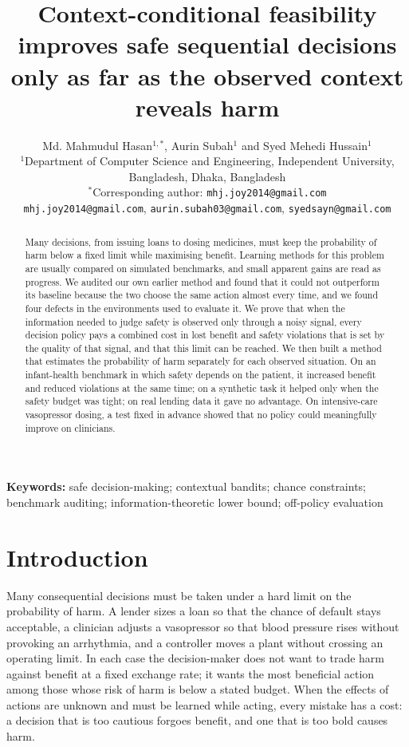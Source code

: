 \documentclass[10pt,a4paper]{article}
\title{\Large\bfseries Context-conditional feasibility improves safe sequential decisions\\ only as far as the observed context reveals harm}
\author{Md. Mahmudul Hasan$^{1,*}$, Aurin Subah$^{1}$ and Syed Mehedi Hussain$^{1}$\\[4pt]
\normalsize $^{1}$Department of Computer Science and Engineering, Independent University, Bangladesh, Dhaka, Bangladesh\\
\normalsize $^{*}$Corresponding author: \texttt{mhj.joy2014@gmail.com}\\
\normalsize \texttt{mhj.joy2014@gmail.com}, \texttt{aurin.subah03@gmail.com}, \texttt{syedsayn@gmail.com}}
\date{}
\begin{document}
\maketitle

\begin{abstract}
\noindent Many decisions, from issuing loans to dosing medicines, must keep the probability of harm
below a fixed limit while maximising benefit. Learning methods for this problem are
usually compared on simulated benchmarks, and small apparent gains are read as progress. We audited our own earlier method and found that it could not outperform its baseline because the two choose the same action almost every time, and we found four defects in the environments used to evaluate it. We prove that
when the information needed to judge safety is observed only through a noisy signal, every decision
policy pays a combined cost in lost benefit and safety violations that is set by the quality of that
signal, and that this limit can be reached. We then built a method that estimates the
probability of harm separately for each observed situation. On an infant-health benchmark in which
safety depends on the patient, it increased benefit and reduced violations at the same time; on a
synthetic task it helped only when the safety budget was tight; on real lending data it gave no
advantage. On intensive-care vasopressor dosing, a test fixed in advance showed that no policy could
meaningfully improve on clinicians.
\end{abstract}

\noindent\textbf{Keywords:} safe decision-making; contextual bandits; chance constraints; benchmark
auditing; information-theoretic lower bound; off-policy evaluation

\section*{Introduction}

Many consequential decisions must be taken under a hard limit on the probability of harm. A lender
sizes a loan so that the chance of default stays acceptable, a clinician adjusts a vasopressor so that
blood pressure rises without provoking an arrhythmia, and a controller moves a plant without crossing
an operating limit. In each case the decision-maker does not want to trade harm against benefit at a
fixed exchange rate; it wants the most beneficial action among those whose risk of harm is below a
stated budget. When the effects of actions are unknown and must be learned while acting, every
mistake has a cost: a decision that is too cautious forgoes benefit, and one that is too bold causes
harm.
\end{document}
